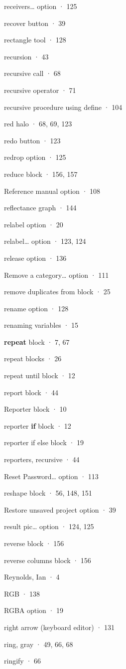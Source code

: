 \documentclass[
  letterpaper,
]{book}
\begin{document}
receivers\ldots{} option · 125

recover button · 39

rectangle tool · 128

recursion · 43

recursive call · 68

recursive operator · 71

recursive procedure using define · 104

red halo · 68, 69, 123

redo button · 123

redrop option · 125

reduce block · 156, 157

Reference manual option · 108

reflectance graph · 144

relabel option · 20

relabel\ldots{} option · 123, 124

release option · 136

Remove a category\ldots{} option · 111

remove duplicates from block · 25

rename option · 128

renaming variables · 15

\textbf{repeat} block · 7, 67

repeat blocks · 26

repeat until block · 12

report block · 44

Reporter block · 10

reporter \textbf{if} block · 12

reporter if else block · 19

reporters, recursive · 44

Reset Password\ldots{} option · 113

reshape block · 56, 148, 151

Restore unsaved project option · 39

result pic\ldots{} option · 124, 125

reverse block · 156

reverse columns block · 156

Reynolds, Ian · 4

RGB · 138

RGBA option · 19

right arrow (keyboard editor) · 131

ring, gray · 49, 66, 68

ringify · 66
\end{document}
